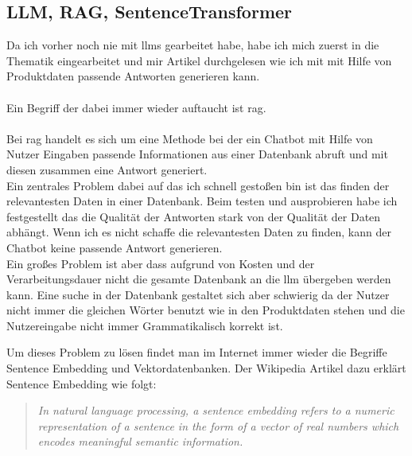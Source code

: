 \subsection{LLM, RAG, SentenceTransformer}\label{sec:umsetzung_intro}
Da ich vorher noch nie mit \gls{llm}s gearbeitet habe, habe ich mich zuerst in die Thematik eingearbeitet 
und mir Artikel durchgelesen wie ich mit mit Hilfe von Produktdaten passende Antworten generieren kann.\\\\
Ein Begriff der dabei immer wieder auftaucht ist \gls{rag}.\\\\
Bei \gls{rag} handelt es sich um eine Methode bei der ein Chatbot mit Hilfe von Nutzer Eingaben passende 
Informationen aus einer Datenbank abruft und mit diesen zusammen eine Antwort generiert.\\
Ein zentrales Problem dabei auf das ich schnell gestoßen bin ist das finden der relevantesten Daten in einer Datenbank.
Beim testen und ausprobieren habe ich festgestellt das die Qualität der Antworten stark von der Qualität der Daten abhängt.
Wenn ich es nicht schaffe die relevantesten Daten zu finden, kann der Chatbot keine passende Antwort generieren.\\
Ein großes Problem ist aber dass aufgrund von Kosten und der Verarbeitungsdauer nicht die gesamte Datenbank an die \gls{llm} übergeben werden kann.
Eine suche in der Datenbank gestaltet sich aber schwierig da der Nutzer nicht immer die gleichen Wörter benutzt wie in den Produktdaten stehen und
die Nutzereingabe nicht immer Grammatikalisch korrekt ist.

\pagebreak
Um dieses Problem zu lösen findet man im Internet immer wieder die Begriffe Sentence Embedding und Vektordatenbanken.
Der Wikipedia Artikel dazu erklärt Sentence Embedding wie folgt:\\
\cite{wiki:SentEmb}
\begin{quote}
    \textit{In natural language processing, a sentence embedding refers to a numeric representation of a sentence in the form of a vector of real numbers which encodes meaningful semantic information.}
\end{quote}\\

